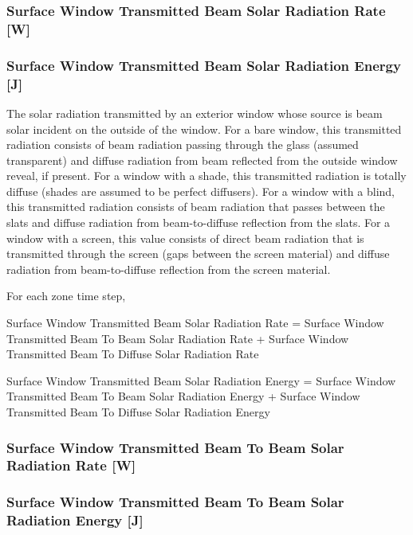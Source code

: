 \subsubsection{Surface Window Transmitted Beam Solar Radiation Rate {[}W{]}}\label{surface-window-transmitted-beam-solar-radiation-rate-w}

\subsubsection{Surface Window Transmitted Beam Solar Radiation Energy {[}J{]}}\label{surface-window-transmitted-beam-solar-radiation-energy-j}

The solar radiation transmitted by an exterior window whose source is beam solar incident on the outside of the window. For a bare window, this transmitted radiation consists of beam radiation passing through the glass (assumed transparent) and diffuse radiation from beam reflected from the outside window reveal, if present. For a window with a shade, this transmitted radiation is totally diffuse (shades are assumed to be perfect diffusers). For a window with a blind, this transmitted radiation consists of beam radiation that passes between the slats and diffuse radiation from beam-to-diffuse reflection from the slats. For a window with a screen, this value consists of direct beam radiation that is transmitted through the screen (gaps between the screen material) and diffuse radiation from beam-to-diffuse reflection from the screen material.

For each zone time step,

Surface Window Transmitted Beam Solar Radiation Rate = Surface Window Transmitted Beam To Beam Solar Radiation Rate + Surface Window Transmitted Beam To Diffuse Solar Radiation Rate

Surface Window Transmitted Beam Solar Radiation Energy = Surface Window Transmitted Beam To Beam Solar Radiation Energy + Surface Window Transmitted Beam To Diffuse Solar Radiation Energy

\subsubsection{Surface Window Transmitted Beam To Beam Solar Radiation Rate {[}W{]}}\label{surface-window-transmitted-beam-to-beam-solar-radiation-rate-w}

\subsubsection{Surface Window Transmitted Beam To Beam Solar Radiation Energy {[}J{]}}\label{surface-window-transmitted-beam-to-beam-solar-radiation-energy-j}

